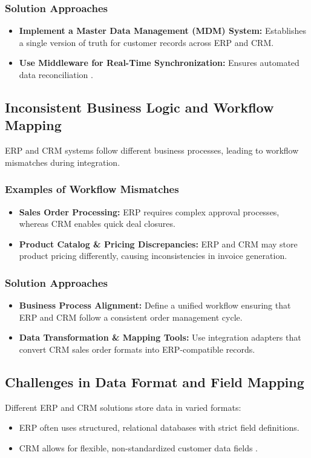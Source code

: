 \subsubsection{Solution Approaches}
\begin{itemize}
    \item \textbf{Implement a Master Data Management (MDM) System:} Establishes a single version of truth for customer records across ERP and CRM.
    \item \textbf{Use Middleware for Real-Time Synchronization:} Ensures automated data reconciliation \cite{chinta2024}.
\end{itemize}

\subsection{Inconsistent Business Logic and Workflow Mapping}
ERP and CRM systems follow different business processes, leading to workflow mismatches during integration.

\subsubsection{Examples of Workflow Mismatches}
\begin{itemize}
    \item \textbf{Sales Order Processing:} ERP requires complex approval processes, whereas CRM enables quick deal closures.
    \item \textbf{Product Catalog \& Pricing Discrepancies:} ERP and CRM may store product pricing differently, causing inconsistencies in invoice generation.
\end{itemize}

\subsubsection{Solution Approaches}
\begin{itemize}
    \item \textbf{Business Process Alignment:} Define a unified workflow ensuring that ERP and CRM follow a consistent order management cycle.
    \item \textbf{Data Transformation \& Mapping Tools:} Use integration adapters that convert CRM sales order formats into ERP-compatible records.
\end{itemize}

\subsection{Challenges in Data Format and Field Mapping}
Different ERP and CRM solutions store data in varied formats:
\begin{itemize}
    \item ERP often uses structured, relational databases with strict field definitions.
    \item CRM allows for flexible, non-standardized customer data fields \cite{tomic2016}.
\end{itemize}


